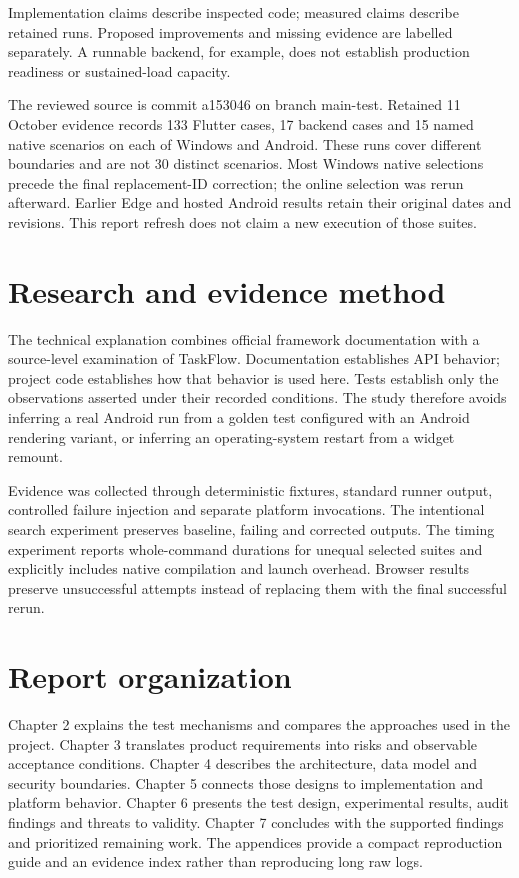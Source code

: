 \documentclass[12pt,a4paper,oneside]{report}
\begin{document}
Implementation claims describe inspected code; measured claims describe retained runs. Proposed improvements and missing evidence are labelled separately. A runnable backend, for example, does not establish production readiness or sustained-load capacity.

The reviewed source is commit a153046 on branch main-test. Retained 11 October evidence records 133 Flutter cases, 17 backend cases and 15 named native scenarios on each of Windows and Android. These runs cover different boundaries and are not 30 distinct scenarios. Most Windows native selections precede the final replacement-ID correction; the online selection was rerun afterward. Earlier Edge and hosted Android results retain their original dates and revisions. This report refresh does not claim a new execution of those suites.

\section{Research and evidence method}
The technical explanation combines official framework documentation with a source-level examination of TaskFlow. Documentation establishes API behavior; project code establishes how that behavior is used here. Tests establish only the observations asserted under their recorded conditions. The study therefore avoids inferring a real Android run from a golden test configured with an Android rendering variant, or inferring an operating-system restart from a widget remount.

Evidence was collected through deterministic fixtures, standard runner output, controlled failure injection and separate platform invocations. The intentional search experiment preserves baseline, failing and corrected outputs. The timing experiment reports whole-command durations for unequal selected suites and explicitly includes native compilation and launch overhead. Browser results preserve unsuccessful attempts instead of replacing them with the final successful rerun.

\section{Report organization}
Chapter 2 explains the test mechanisms and compares the approaches used in the project. Chapter 3 translates product requirements into risks and observable acceptance conditions. Chapter 4 describes the architecture, data model and security boundaries. Chapter 5 connects those designs to implementation and platform behavior. Chapter 6 presents the test design, experimental results, audit findings and threats to validity. Chapter 7 concludes with the supported findings and prioritized remaining work. The appendices provide a compact reproduction guide and an evidence index rather than reproducing long raw logs.
\end{document}
